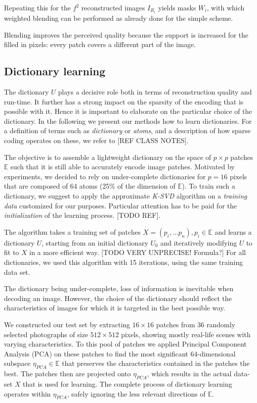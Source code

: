 Repeating this for the $f^2$ reconstructed images $I_{R_i}$ yields masks $W_i$, with which weighted blending can be performed as already done for the simple scheme.

Blending improves the perceived quality because the support is increased for the filled in pixels: every patch covers a different part of the image.



\subsection{Dictionary learning}
The dictionary $U$ plays a decisive role both in terms of reconstruction quality and run-time. It further has a strong impact on the sparsity of the encoding that is possible with it. Hence it is important to elaborate on the particular choice of the dictionary. In the following we present our methods how to learn dictionaries. For a definition of terms such as \textit{dictionary} or \textit{atoms}, and a description of how sparse coding operates on these, we refer to [REF CLASS NOTES].

The objective is to assemble a lightweight dictionary on the space of $p \times p$ patches $\mathbb{E}$ such that it is still able to accurately encode image patches. Motivated by experiments, we decided to rely on under-complete dictionaries for $p=16$ pixels that are composed of 64 atoms (25\% of the dimension of $\mathbb{E}$). To train such a dictionary, we suggest to apply the approximate \textit{K-SVD} algorithm on a \textit{training data} customized for our purposes. Particular attention has to be paid for the \textit{initialization} of the learning process. [TODO REF]. 

The algorithm takes a training set of patches $X = (p_i, \ldots p_n), p_i \in \mathbb{E}$ and learns a dictionary $U$, starting from an initial dictionary $U_0$ and iteratively modifying $U$ to fit to $X$ in a more efficient way. [TODO VERY UNPRECISE! Formula?]
For all dictionaries, we used this algorithm with 15 iterations, using the same training data set.

The dictionary being under-complete, loss of information is inevitable when decoding an image. However, the choice of the dictionary should reflect the characteristics of images for which it is targeted in the best possible way. 

We constructed our test set by extracting $16\times 16$ patches from 36 randomly selected photographs of size $512\times 512$ pixels, showing mostly real-life scenes with varying characteristics. To this pool of patches we applied Principal Component Analysis (PCA) on these patches to find the most significant 64-dimensional subspace $\eta_{PCA}\in\mathbb{E}$ that preserves the characteristics contained in the patches the best. The patches then are projected onto $\eta_{PCA}$, which results in the actual data-set $X$ that is used for learning. The complete process of dictionary learning operates within $\eta_{PCA}$, safely ignoring the less relevant directions of $\mathbb{E}$.

